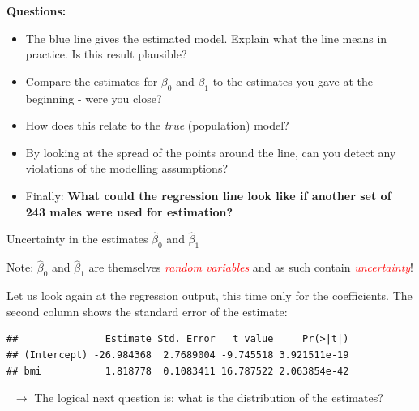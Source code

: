 \documentclass[10pt,ignorenonframetext,]{beamer}
\newenvironment{Shaded}{\begin{snugshade}}{\end{snugshade}}
\newcommand{\KeywordTok}[1]{\textcolor[rgb]{0.13,0.29,0.53}{\textbf{#1}}}
\newcommand{\OperatorTok}[1]{\textcolor[rgb]{0.81,0.36,0.00}{\textbf{#1}}}
\newcommand{\NormalTok}[1]{#1}
\begin{document}
\begin{frame}

\textbf{Questions:}

\begin{itemize}
\item
  The blue line gives the estimated model. Explain what the line means
  in practice. Is this result plausible?
\item
  Compare the estimates for \(\beta_0\) and \(\beta_1\) to the estimates
  you gave at the beginning - were you close?
\item
  How does this relate to the \emph{true} (population) model?
\item
  By looking at the spread of the points around the line, can you detect
  any violations of the modelling assumptions?
\item
  Finally: \textbf{What could the regression line look like if another
  set of 243 males were used for estimation?}
\end{itemize}

\end{frame}

\begin{frame}[fragile]

\begin{block}{Uncertainty in the estimates \(\hat\beta_0\) and
\(\hat\beta_1\)}

\vspace{2mm}

Note: \(\hat\beta_0\) and \(\hat\beta_1\) are themselves
\emph{\textcolor{red}{random variables}} and as such contain
\emph{\textcolor{red}{uncertainty}}!

\vspace{4mm}

Let us look again at the regression output, this time only for the
coefficients. The second column shows the standard error of the
estimate: \vspace{2mm}

\scriptsize

\begin{Shaded}
\end{Shaded}

\begin{verbatim}
##               Estimate Std. Error   t value     Pr(>|t|)
## (Intercept) -26.984368  2.7689004 -9.745518 3.921511e-19
## bmi           1.818778  0.1083411 16.787522 2.063854e-42
\end{verbatim}

\normalsize
\(~\) \(\rightarrow\) The logical next question is: what is the
distribution of the estimates?

\end{block}

\end{frame}
\end{document}
